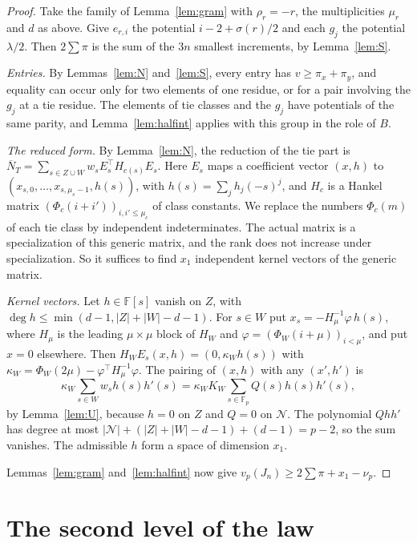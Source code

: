 \documentclass[11pt]{amsart}
\theoremstyle{definition}
\theoremstyle{remark}
\numberwithin{equation}{section}
\newcommand{\F}{\mathbb F}
\begin{document}
\begin{proof}
Take the family of Lemma~\ref{lem:gram} with $\rho_r=-r$, the multiplicities $\mu_r$ and $d$ as above. Give $e_{r,i}$
the potential $i-2+\sigma(r)/2$ and each $g_j$ the potential $\lambda/2$. Then $2\sum\pi$ is the sum of the $3n$ smallest
increments, by Lemma~\ref{lem:S}.

\emph{Entries.} By Lemmas~\ref{lem:N} and~\ref{lem:S}, every entry has $v\ge\pi_x+\pi_y$, and equality can occur only
for two elements of one residue, or for a pair involving the $g_j$ at a tie residue. The elements of tie classes and
the $g_j$ have potentials of the same parity, and Lemma~\ref{lem:halfint} applies with this group in the role of $B$.

\emph{The reduced form.} By Lemma~\ref{lem:N}, the reduction of the tie part is
$\overline N_T=\sum_{s\in Z\cup W}w_sE_s^{\top}H_{c(s)}E_s$. Here $E_s$ maps a coefficient vector $(x,h)$ to
$(x_{s,0},\dots,x_{s,\mu_s-1},h(s))$, with $h(s)=\sum_jh_j(-s)^j$, and $H_c$ is a Hankel matrix
$(\Phi_c(i+i'))_{i,i'\le\mu_c}$ of class constants. We replace the numbers $\Phi_c(m)$ of each tie class by independent
indeterminates. The actual matrix is a specialization of this generic matrix, and the rank does not increase under
specialization. So it suffices to find $x_1$ independent kernel vectors of the generic matrix.

\emph{Kernel vectors.} Let $h\in\F[s]$ vanish on $Z$, with $\deg h\le\min(d-1,|Z|+|W|-d-1)$. For $s\in W$ put
$x_s=-H_\mu^{-1}\varphi\,h(s)$, where $H_\mu$ is the leading $\mu\times\mu$ block of $H_W$ and $\varphi=(\Phi_W(i+\mu))_{i<\mu}$,
and put $x=0$ elsewhere. Then $H_WE_s(x,h)=(0,\kappa_Wh(s))$ with $\kappa_W=\Phi_W(2\mu)-\varphi^{\top}H_\mu^{-1}\varphi$. The
pairing of $(x,h)$ with any $(x',h')$ is
\[
 \kappa_W\sum_{s\in W}w_sh(s)h'(s)=\kappa_WK_W\sum_{s\in\F_p}Q(s)h(s)h'(s),
\]
by Lemma~\ref{lem:U}, because $h=0$ on $Z$ and $Q=0$ on $\mathcal N$. The polynomial $Qhh'$ has degree at most
$|\mathcal N|+(|Z|+|W|-d-1)+(d-1)=p-2$, so the sum vanishes. The admissible $h$ form a space of dimension $x_1$.

Lemmas~\ref{lem:gram} and~\ref{lem:halfint} now give $v_p(J_n)\ge2\sum\pi+x_1-\nu_p$.
\end{proof}

\section{The second level of the law}\label{sec:second}
\end{document}
